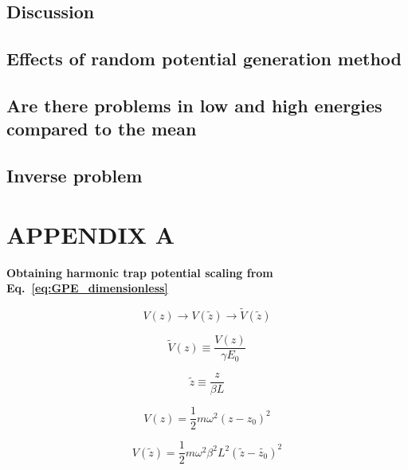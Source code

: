 \documentclass[a4paper,times,12pt]{article}
\begin{document}
\subsection{Discussion}
\subsection{Effects of random potential generation method}
\subsection{Are there problems in low and high energies compared to the mean}
\subsection{Inverse problem}


\clearpage

\clearpage




\appendix
\section{APPENDIX A}
\label{ap:scale}

\textbf{Obtaining harmonic trap potential scaling from Eq.~\eqref{eq:GPE_dimensionless}}

\begin{equation}
\label{eq:GPESCALE_harmonic_potential_transform}
    V(z) \rightarrow V(\widetilde{z}) \rightarrow \widetilde{V}(\widetilde{z})
\end{equation}

\begin{equation}
\label{eq:GPESCALE_dimensionless_harmonic_potential}
    \widetilde{V}(z) \equiv \frac{V(z)}{\gamma E_0}
\end{equation}

\begin{equation}
\label{eq:GPESCALE_dimensionless_length}
    \widetilde{z} \equiv \frac{z}{\beta L} 
\end{equation}

\begin{equation}
\label{eq:GPESCALE_harmonic_potential}
    V(z) = \frac{1}{2}m\omega^2 (z-z_0)^2
\end{equation}

\begin{equation}
\label{eq:GPESCALE_harmonic_length_transform}
    V(\widetilde{z}) = \frac{1}{2}m\omega^2 \beta^2 L^2 (\widetilde{z}-\widetilde{z_0})^2
\end{equation}
\end{document}
